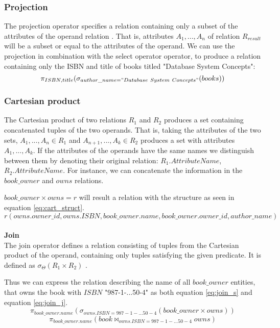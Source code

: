 \subsubsection*{Projection}
The projection operator specifies a relation containing only a subset of the attributes of the operand relation \cite{DBSBook}.
That is, attributes $A_1, ..., A_n$ of relation $R_{result}$ will be a subset or equal to the attributes of the operand.
We can use the projection in combination with the select operator operator, to produce a relation containing only the ISBN and title of books titled "Database System Concepts":
$$\pi_{ISBN,title} (\sigma_{author\_name = "Database\ System\ Concepts"}(books))$$
\subsubsection*{Cartesian product}
The Cartesian product of two relations $R_1$ and $R_2$ produces a set containing concatenated tuples of the two operands.
That is, taking the attributes of the two sets, $A_1,...,A_n \in R_1$ and $A_{n+1},...,A_k \in R_2$ produces a set with attributes $A_1,...,A_k$.
If the attributes of the operands have the same names we distinguish between them  by denoting their original relation: $R_1.AttributeName$, $R_2.AttributeName$. \cite{DBSBook}
For instance, we can concatenate the information in the $book\_owner$ and $owns$  relations.

$book\_owner \times owns = r$ will result a relation with the structure as seen in equation \ref{eq:cart_struct}.
\begin{equation}\label{eq:cart_struct}
    r(owns.owner\_id, owns.ISBN,book\_owner.name,book\_owner.owner\_id, author\_name)
\end{equation}\\    
\textbf{Join}\\

The join operator defines a relation consisting of tuples from the Cartesian product of the operand, containing only tuples satisfying the given predicate.
It is defined as $\sigma_{\Theta} (R_1 \times R_2)$ \cite{DBSBook}.

Thus we can express the relation describing the name of all $book\_owner$ entities, that owns the book with $ISBN$ "987-1-...50-4" as both equation \ref{eq:join_s} and equation \ref{eq:join_j}.
\begin{equation}\label{eq:join_s}
    \pi_{book\_owner.name} (\sigma_{owns.ISBN = 987-1-...50-4}  (book\_owner \times owns))
\end{equation}
\begin{equation}\label{eq:join_j}
    \pi_{book\_owner.name} (book \Join_{owns.ISBN = 987-1-...50-4} owns) 
\end{equation}\\


